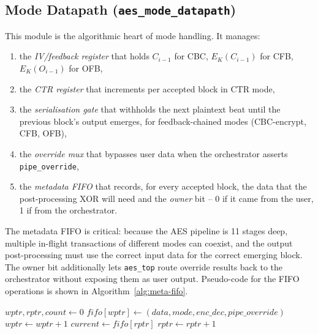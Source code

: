 \documentclass[conference,10pt,a4paper]{IEEEtran}
\begin{document}
\subsection{Mode Datapath (\texttt{aes\_mode\_datapath})}
This module is the algorithmic heart of mode handling.  It manages:
\begin{enumerate}
  \item the \emph{IV/feedback register} that holds $C_{i-1}$ for CBC,
        $E_K(C_{i-1})$ for CFB, $E_K(O_{i-1})$ for OFB,
  \item the \emph{CTR register} that increments per accepted block in
        CTR mode,
  \item the \emph{serialisation gate} that withholds the next plaintext
        beat until the previous block's output emerges, for
        feedback-chained modes (CBC-encrypt, CFB, OFB),
  \item the \emph{override mux} that bypasses user data when the
        orchestrator asserts \texttt{pipe\_override},
  \item the \emph{metadata FIFO} that records, for every accepted block,
        the data that the post-processing XOR will need and the
        \emph{owner} bit -- 0 if it came from the user, 1 if from the
        orchestrator.
\end{enumerate}
The metadata FIFO is critical: because the AES pipeline is 11 stages
deep, multiple in-flight transactions of different modes can coexist,
and the output post-processing must use the correct input data for the
correct emerging block.  The owner bit additionally lets \texttt{aes\_top}
route override results back to the orchestrator without exposing them as
user output.  Pseudo-code for the FIFO operations is shown in
Algorithm~\ref{alg:meta-fifo}.

\begin{algorithm}[t]
\caption{Per-cycle metadata-FIFO update.}
\label{alg:meta-fifo}
\begin{algorithmic}[1]
  \State $\textit{wptr},\textit{rptr},\textit{count} \gets 0$
\Else
    \State $\textit{fifo}[\textit{wptr}]
            \gets (data, mode, enc\_dec, pipe\_override)$
    \State $\textit{wptr} \gets \textit{wptr} + 1$
  \EndIf
    \State $\textit{current} \gets \textit{fifo}[\textit{rptr}]$
    \State $\textit{rptr}    \gets \textit{rptr} + 1$
  \EndIf
\EndIf
\end{algorithmic}
\end{algorithm}
\end{document}
